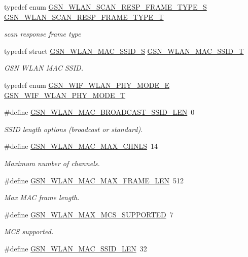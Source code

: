 \begin{DoxyCompactItemize}
typedef enum \hyperlink{a00641_ga3f0acfab3987e81164e864f7186c7187}{GSN\_\-WLAN\_\-SCAN\_\-RESP\_\-FRAME\_\-TYPE\_\-S} \hyperlink{a00641_gaa94bed1d5a9ada3dfd819b8719bf6d55}{GSN\_\-WLAN\_\-SCAN\_\-RESP\_\-FRAME\_\-TYPE\_\-T}
\begin{DoxyCompactList}\small\item\em scan response frame type \end{DoxyCompactList}\item 
typedef struct \hyperlink{a00417}{GSN\_\-WLAN\_\-MAC\_\-SSID\_\-S} \hyperlink{a00641_gab5c477ba63fc3009f84b8dfc5efb6b81}{GSN\_\-WLAN\_\-MAC\_\-SSID\_\-T}
\begin{DoxyCompactList}\small\item\em GSN WLAN MAC SSID. \end{DoxyCompactList}\item 
typedef enum \hyperlink{a00641_ga9150700f5a8033a0c34dba0d69e2ff38}{GSN\_\-WIF\_\-WLAN\_\-PHY\_\-MODE\_\-E} \hyperlink{a00641_ga9f600b5e4ee36d4315abb0cd1e0b1a78}{GSN\_\-WIF\_\-WLAN\_\-PHY\_\-MODE\_\-T}
\item 
\#define \hyperlink{a00641_gabe983e40f4fad264d1750aa6c4bcfcac}{GSN\_\-WLAN\_\-MAC\_\-BROADCAST\_\-SSID\_\-LEN}~0
\begin{DoxyCompactList}\small\item\em SSID length options (broadcast or standard). \end{DoxyCompactList}\item 
\#define \hyperlink{a00641_ga81f65ed973227d85ed9048e0047663da}{GSN\_\-WLAN\_\-MAC\_\-MAX\_\-CHNLS}~14
\begin{DoxyCompactList}\small\item\em Maximum number of channels. \end{DoxyCompactList}\item 
\#define \hyperlink{a00641_gae731ba25818bdbc75a996de819a860e6}{GSN\_\-WLAN\_\-MAC\_\-MAX\_\-FRAME\_\-LEN}~512
\begin{DoxyCompactList}\small\item\em Max MAC frame length. \end{DoxyCompactList}\item 
\#define \hyperlink{a00641_ga8c7cea28939d8ce06e159841483e73c9}{GSN\_\-WLAN\_\-MAX\_\-MCS\_\-SUPPORTED}~7
\begin{DoxyCompactList}\small\item\em MCS supported. \end{DoxyCompactList}\item 
\#define \hyperlink{a00641_ga93c24ba92c21c82b929e23b532ec4002}{GSN\_\-WLAN\_\-MAC\_\-SSID\_\-LEN}~32
\end{DoxyCompactItemize}


